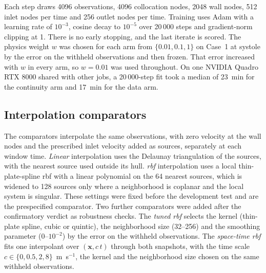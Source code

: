 \documentclass[12pt,a4paper]{article}
\newcommand{\RBF}{\ac{rbf}\xspace}
\newcommand{\RBFcap}{\Ac{rbf}\xspace}
\theoremstyle{definition}
\numberwithin{equation}{section}
\begin{document}
Each step draws 4096 observations, 4096 collocation nodes, 2048 wall nodes, 512 inlet nodes per time and 256 outlet nodes per time. Training uses Adam with a learning rate of $10^{-3}$, cosine decay to $10^{-5}$ over 20\,000 steps and gradient-norm clipping at 1. There is no early stopping, and the last iterate is scored. The physics weight $w$ was chosen for each arm from $\{0.01,0.1,1\}$ on Case~1 at systole by the error on the withheld observations and then frozen. That error increased with $w$ in every arm, so $w=0.01$ was used throughout. On one NVIDIA Quadro RTX 8000 shared with other jobs, a 20\,000-step fit took a median of 23~min for the continuity arm and 17~min for the data arm.

\subsection{Interpolation comparators}
\label{sec:interpolation}
The comparators interpolate the same observations, with zero velocity at the wall nodes and the prescribed inlet velocity added as sources, separately at each window time. \emph{Linear} interpolation uses the Delaunay triangulation of the sources, with the nearest source used outside its hull. \emph{\RBFcap} interpolation uses a local thin-plate-spline \RBF with a linear polynomial on the 64 nearest sources, which is widened to 128 sources only where a neighborhood is coplanar and the local system is singular. These settings were fixed before the development test and are the prespecified comparator. Two further comparators were added after the confirmatory verdict as robustness checks. The \emph{tuned \RBF} selects the kernel (thin-plate spline, cubic or quintic), the neighborhood size (32--256) and the smoothing parameter ($0$--$10^{-2}$) by the error on the withheld observations. The \emph{space-time \RBF} fits one interpolant over $(\mathbf x, c\,t)$ through both snapshots, with the time scale $c\in\{0,0.5,2,8\}$~m~s$^{-1}$, the kernel and the neighborhood size chosen on the same withheld observations.
\end{document}
